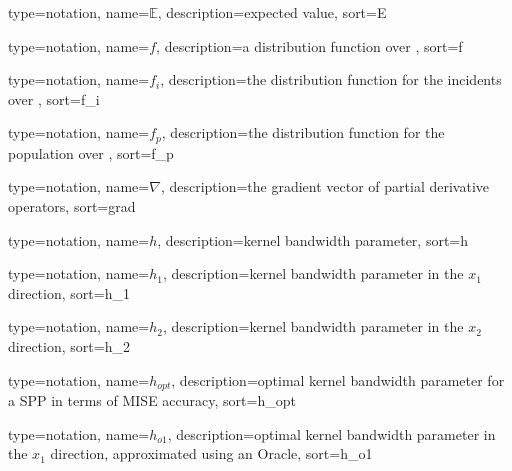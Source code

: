 

{%
   type=notation,
   name={\ensuremath{\mathbb{E}}},
   description={expected value},
   sort={E}
}

{%
   type=notation,
   name={\ensuremath{f}},
   description={a distribution function over },
   sort={f}
}

{%
   type=notation,
   name={\ensuremath{f_i}},
   description={the distribution function for the incidents over },
   sort={f_i}
}

{%
   type=notation,
   name={\ensuremath{f_p}},
   description={the distribution function for the population over },
   sort={f_p}
}

{%
   type=notation,
   name={\ensuremath{\nabla}},
   description={the gradient vector of partial derivative operators},
   sort={grad}
}

{%
   type=notation,
   name={\ensuremath{h}},
   description={kernel bandwidth parameter},
   sort={h}
}

{%
   type=notation,
   name={\ensuremath{h_1}},
   description={kernel bandwidth parameter in the \ensuremath{x_1} direction},
   sort={h_1}
}

{%
   type=notation,
   name={\ensuremath{h_2}},
   description={kernel bandwidth parameter in the \ensuremath{x_2} direction},
   sort={h_2}
}

{%
   type=notation,
   name={\ensuremath{h_{\mathit{opt}}}},
   description={optimal kernel bandwidth parameter for a SPP in terms of MISE accuracy},
   sort={h_opt}
}

{%
   type=notation,
   name={\ensuremath{h_{o1}}},
   description={optimal kernel bandwidth parameter in the \ensuremath{x_1} direction, approximated using an Oracle},
   sort={h_o1}
}

